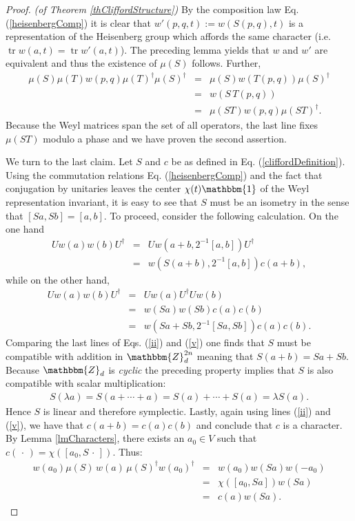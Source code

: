 \documentclass[aps,twocolumn,floatfix]{revtex4}
\def\ZZ{\mathbbm{Z}}
\def\Id{\mathbbm{1}}
\def\spacedot{\,\cdot\,}
\DeclareMathOperator{\tr}{tr}
\begin{document}
\begin{proof} \emph{(of Theorem \ref{thCliffordStructure})}
	By the composition law Eq. (\ref{heisenbergComp}) it is clear
	that $w'(p,q,t):=w(S(p,q),t)$ is a representation of the Heisenberg
	group which affords the same character (i.e. $\tr w(a,t)=\tr w'(a,t)$).
	The preceding lemma
	yields that $w$ and $w'$ are equivalent and thus the existence of
	$\mu(S)$ follows. Further,
	\begin{eqnarray*}
		\mu(S)\mu(T) w(p,q) \mu(T)^\dagger\mu(S)^\dagger
		&=& \mu(S) w(T(p,q)) \mu(S)^\dagger \\
		&=& w(S\,T(p,q)) \\
		&=& \mu(ST) w(p,q) \mu(ST)^\dagger.
	\end{eqnarray*}
	Because the Weyl matrices span the set of all operators, the last
	line fixes $\mu(ST)$ modulo a phase and we have proven the second
	assertion.
	
	We turn to the last claim. Let $S$ and $c$ be as defined in Eq.
	(\ref{cliffordDefinition}).  Using the commutation relations Eq.
	(\ref{heisenbergComp}) and the fact that conjugation by unitaries
	leaves the center $\chi(t) \Id$ of the Weyl representation
	invariant, it is easy to see that $S$ must be an isometry in the sense
	that $[Sa,Sb]=[a,b]$. 
	To proceed, consider the following calculation. On the one hand
	\begin{eqnarray}
		U w(a) w(b) U^\dagger 
		&=& U w(a+b,2^{-1}[a,b]) U^\dagger \label{ii} \\
		&=& w(S(a+b),2^{-1}[a,b]) c(a+b), \nonumber 
	\end{eqnarray}
	while on the other hand,
	\begin{eqnarray}
		U w(a) w(b) U^\dagger 
		&=& U w(a) U^\dagger U w(b)\label{v}\\
		&=& w(Sa) w(Sb) c(a) c(b) \nonumber \\
		&=& w(Sa+Sb,2^{-1}[Sa,Sb]) c(a) c(b). \nonumber  
	\end{eqnarray}
	Comparing the last lines of Eqs. (\ref{ii}) and (\ref{v}) one finds
	that  $S$ must be compatible with addition in $\ZZ_d^{2n}$ meaning
	that $S(a+b)=Sa+Sb$.  Because $\ZZ_d$ is \emph{cyclic} the preceding
	property implies that $S$ is also compatible with scalar
	multiplication: 
	\begin{eqnarray*}
		S(\lambda a)=S(a+\cdots+a)=S(a)+\cdots+S(a)=\lambda S(a).
	\end{eqnarray*} 
	Hence $S$ is linear and therefore symplectic.  Lastly, again using
	lines (\ref{ii}) and (\ref{v}), we have that $c(a+b)=c(a)c(b)$ and
	conclude that $c$  is a character. 
	By Lemma \ref{lmCharacters}, there exists an $a_0\in V$ such that
	$c(\spacedot)=\chi([a_0,S\spacedot])$.
	Thus:
	\begin{eqnarray*}
		w(a_0) \mu(S)\,w(a)\,\mu(S)^\dagger w(a_0)^\dagger 
		&=& w(a_0) w(Sa) w(-a_0) \\
		&=& \chi([a_0, Sa]) w(Sa) \\
		&=& c(a) w(Sa).
	\end{eqnarray*}
\end{proof}
\end{document}
